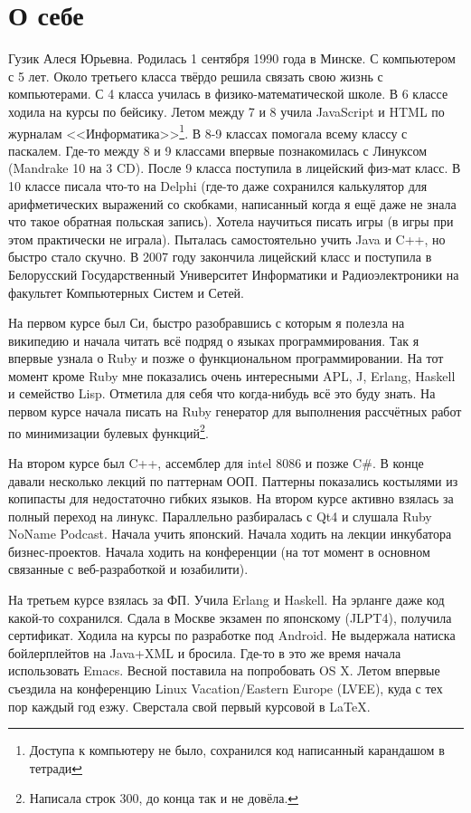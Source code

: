\documentclass[14pt,a4paper]{extarticle}
\begin{document}
\section*{О себе}

Гузик Алеся Юрьевна. Родилась 1 сентября 1990 года в Минске. С
компьютером с 5 лет. Около третьего класса твёрдо решила связать свою
жизнь с компьютерами. С 4 класса училась в физико-математической
школе. В 6 классе ходила на курсы по бейсику. Летом между 7 и 8
учила JavaScript и HTML по журналам <<Информатика>>\footnote{Доступа
к компьютеру не было, сохранился код написанный карандашом в тетради}.
В 8-9 классах помогала всему классу с паскалем. Где-то между 8 и 9
классами впервые познакомилась с Линуксом (Mandrake 10 на 3 CD).
После 9 класса поступила в лицейский физ-мат класс. В 10 классе писала
что-то на Delphi (где-то даже сохранился калькулятор для
арифметических выражений со скобками, написанный когда я ещё даже не
знала что такое обратная польская запись). Хотела научиться писать игры
(в игры при этом практически не играла). Пыталась самостоятельно учить
Java и C++, но быстро стало скучно. В 2007 году закончила лицейский
класс и поступила в Белорусский Государственный Университет Информатики
и Радиоэлектроники на факультет Компьютерных Систем и Сетей.

На первом курсе был Си, быстро разобравшись с которым я полезла на
википедию и начала читать всё подряд о языках программирования. Так я впервые узнала о
Ruby и позже о функциональном программировании. На тот момент кроме
Ruby мне показались очень интересными APL, J, Erlang, Haskell и
семейство Lisp. Отметила для себя что когда-нибудь всё это буду знать.
На первом курсе начала писать на Ruby генератор для выполнения
рассчётных работ по минимизации булевых функций\footnote{Написала
строк 300, до конца так и не довёла.}.

На втором курсе был C++, ассемблер для intel 8086 и позже C\#. В конце
давали несколько лекций по паттернам ООП. Паттерны показались
костылями из копипасты для недостаточно гибких языков. На втором курсе
активно взялась за полный переход на линукс. Параллельно разбиралась с Qt4
и слушала Ruby NoName Podcast. Начала учить японский. Начала ходить на
лекции инкубатора бизнес-проектов. Начала ходить на конференции (на тот
момент в основном связанные с веб-разработкой и юзабилити).

На третьем курсе взялась за ФП. Учила Erlang и Haskell. На эрланге даже
код какой-то сохранился. Сдала в Москве экзамен по японскому (JLPT4),
получила сертификат. Ходила на курсы по разработке под Android. Не
выдержала натиска бойлерплейтов на Java+XML и бросила. Где-то в это же
время начала использовать Emacs. Весной поставила на попробовать OS X.
Летом впервые съездила на конференцию Linux Vacation/Eastern Europe
(LVEE), куда с тех пор каждый год езжу. Сверстала свой первый курсовой
в \LaTeX.
\end{document}
